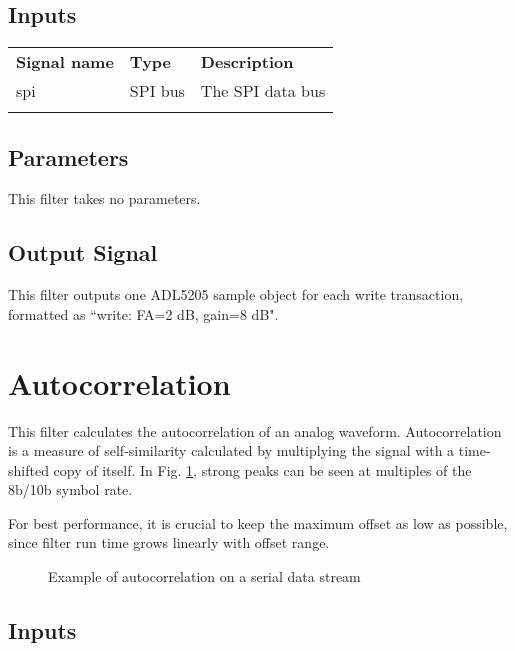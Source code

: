 \subsection{Inputs}

\begin{tabularx}{16cm}{llX}
\thickhline
\textbf{Signal name} & \textbf{Type} & \textbf{Description} \\
\thickhline
spi & SPI bus & The SPI data bus \\
\thickhline
\end{tabularx}

\subsection{Parameters}

This filter takes no parameters.

\subsection{Output Signal}

This filter outputs one ADL5205 sample object for each write transaction, formatted as ``write: FA=2 dB, gain=8 dB".

\pagebreak
\section{Autocorrelation}
\label{filter:autocorrelation}

This filter calculates the autocorrelation of an analog waveform. Autocorrelation is a measure of self-similarity
calculated by multiplying the signal with a time-shifted copy of itself. In Fig. \ref{filter_autocorr}, strong peaks
can be seen at multiples of the 8b/10b symbol rate.

For best performance, it is crucial to keep the maximum offset as low as possible, since filter run time grows linearly
with offset range.

\begin{figure}[h]
\centering
{}
\caption{Example of autocorrelation on a serial data stream}
\label{filter_autocorr}
\end{figure}

\subsection{Inputs}

